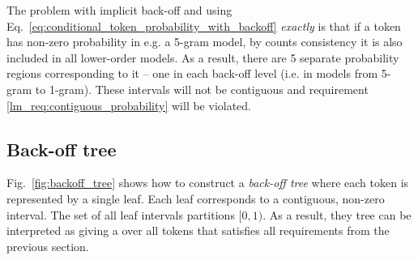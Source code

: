 \documentclass{IIBproject}
\makeatletter
\newcommand*{\eg}{e.g.\@\xspace}
\newcommand*{\ie}{i.e.\@\xspace}
\DeclareRobustCommand*{\AbbreviationWithDot}[1]{\@ifnextchar{.}{#1}{#1.\@\xspace}}
\DeclareRobustCommand*{\pmf}{\AbbreviationWithDot{p.m.f}}
\makeatother
\begin{document}
The problem with implicit back-off and using Eq.~\ref{eq:conditional_token_probability_with_backoff} \emph{exactly} is that if a token has non-zero probability in \eg a 5-gram model, by counts consistency it is also included in all lower-order models. As a result, there are 5 separate probability regions corresponding to it -- one in each back-off level (\ie in models from 5-gram to 1-gram). These intervals will not be contiguous and requirement \ref{lm_req:contiguous_probability} will be violated.

\subsection{Back-off tree}

Fig.~\ref{fig:backoff_tree} shows how to construct a \emph{back-off tree} where each token is represented by a single leaf. Each leaf corresponds to a contiguous, non-zero interval. The set of all leaf intervals partitions $[0,1)$. As a result, they tree can be interpreted as giving a \pmf over all tokens that satisfies all requirements from the previous section.

\newlength{\vertexSize}
\setlength{\vertexSize}{10 pt}


%
\newcommand{\rootVertex}[2] {
	\node [vertex,fill=black!0] at (#1,#2) {};
}

%
\newcommand{\backoff}[6] {
	\draw [shorten >= 0.5*(\vertexSize+\pgflinewidth), shorten <= 0.5*(\vertexSize+\pgflinewidth), ->] (#1,#2) to [bend #5=12.5] (#3,#4);
	\node [vertex,fill=black!10] at (#3,#4) {\tiny #6};
}

%
\newcommand{\leaf}[6] {
	\draw [shorten >= 0.5*(\vertexSize+\pgflinewidth), shorten <= 0.5*(\vertexSize+\pgflinewidth), ->] (#1,#2) to [bend #5=12.5] (#3,#4);
	\node [vertex,fill=black!0] at (#3,#4) {\tiny #6};
}
\end{document}
